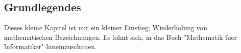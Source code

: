 \subsection{Grundlegendes}
    Dieses kleine Kapitel ist nur ein kleiner Einstieg; Wiederholung von mathematischen Bezeichnungen. Es lohnt sich, in das Buch "Mathematik fuer Informatiker" hineinzuschauen.
\newpage
